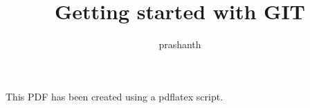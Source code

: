 \documentclass[10pt]{article}
\author{prashanth}
\title{Getting started with GIT}
\begin{document}
	\maketitle
	This PDF has been created using a pdflatex script.
\end{document}
